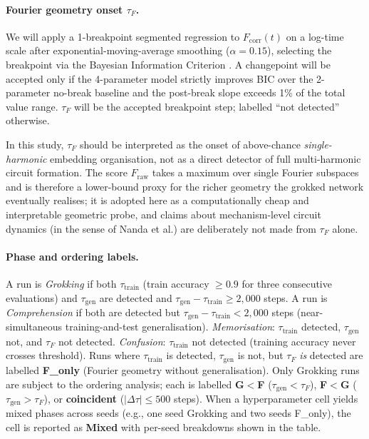 \documentclass[12pt,openany,oneside,a4paper]{book}
\newcommand{\taug}{\tau_{\mathrm{gen}}}
\newcommand{\tauf}{\tau_{F}}
\newcommand{\Dtau}{\Delta\tau}
\newcommand{\fcorr}{F_{\mathrm{corr}}}
\begin{document}
\paragraph{Fourier geometry onset $\tauf$.}
We will apply a 1-breakpoint segmented regression to $\fcorr(t)$ on
a log-time scale after exponential-moving-average smoothing
($\alpha = 0.15$), selecting the breakpoint via the Bayesian
Information Criterion \cite{schwarz1978estimating}.
A changepoint will be accepted only if the 4-parameter model strictly
improves BIC over the 2-parameter no-break baseline and the
post-break slope exceeds 1\% of the total value range.
$\tauf$ will be the accepted breakpoint step; labelled ``not detected''
otherwise.

In this study, $\tauf$ should be interpreted as the onset of
above-chance \emph{single-harmonic} embedding organisation, not as a
direct detector of full multi-harmonic circuit formation.
The score $F_{\mathrm{raw}}$ takes a maximum over single Fourier
subspaces and is therefore a lower-bound proxy for the richer
geometry the grokked network eventually realises; it is adopted
here as a computationally cheap and interpretable geometric probe,
and claims about mechanism-level circuit dynamics (in the sense of
Nanda et al.) are deliberately not made from $\tauf$ alone.

\paragraph{Phase and ordering labels.}
A run is \textit{Grokking} if both $\tau_{\mathrm{train}}$
(train accuracy $\geq0.9$ for three consecutive evaluations)
and $\taug$ are detected and $\taug - \tau_{\mathrm{train}}
\geq 2{,}000$ steps.
A run is \textit{Comprehension} if both are detected but
$\taug - \tau_{\mathrm{train}} < 2{,}000$ steps (near-simultaneous
training-and-test generalisation).
\textit{Memorisation}: $\tau_{\mathrm{train}}$ detected, $\taug$ not,
and $\tauf$ not detected.
\textit{Confusion}: $\tau_{\mathrm{train}}$ not detected (training
accuracy never crosses threshold).
Runs where $\tau_{\mathrm{train}}$ is detected, $\taug$ is not, but
$\tauf$ \emph{is} detected are labelled \textbf{F\_only} (Fourier
geometry without generalisation).
Only Grokking runs are subject to the ordering analysis; each is
labelled
\textbf{G$<$F} ($\taug < \tauf$),
\textbf{F$<$G} ($\taug > \tauf$),
or \textbf{coincident} ($|\Dtau| \leq 500$ steps).
When a hyperparameter cell yields mixed phases across seeds (e.g.,
one seed Grokking and two seeds F\_only), the cell is reported as
\textbf{Mixed} with per-seed breakdowns shown in the table.
\end{document}
